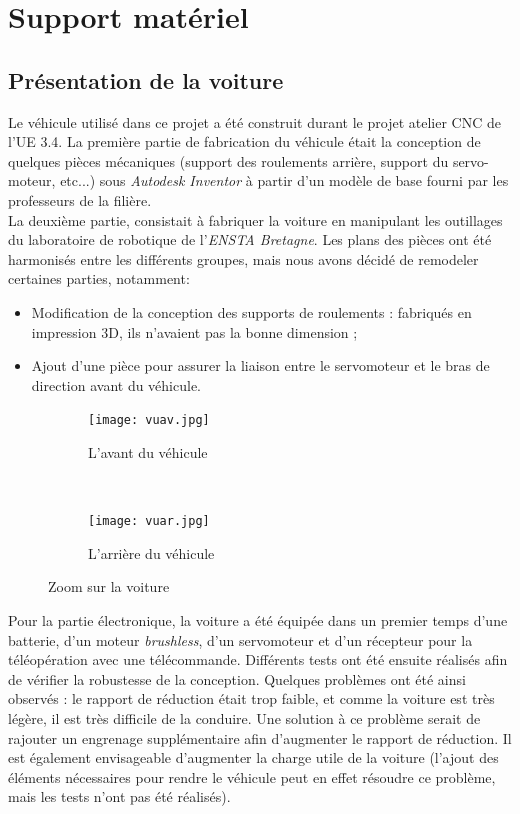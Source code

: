 \documentclass[12pt, openany]{report}
\begin{document}
\section{Support matériel}
\subsection{Présentation de la voiture}
Le véhicule utilisé dans ce projet a été construit durant le projet atelier \textsc{CNC} de l’UE 3.4. La première partie de fabrication du véhicule était la conception de quelques pièces mécaniques (support des roulements arrière, support du servo-moteur, etc...) sous \textit{Autodesk Inventor} à partir d'un modèle de base fourni par les professeurs de la filière.\\

La deuxième partie, consistait à fabriquer la voiture en manipulant les outillages du laboratoire de robotique de l'\textit{ENSTA Bretagne}. Les plans des pièces ont été harmonisés entre les différents groupes, mais nous avons décidé de remodeler certaines parties, notamment:

\begin{itemize}[label=\textbullet, font=\small]
    \item Modification de la conception des supports de roulements : fabriqués en impression \textsc{3D}, ils n'avaient pas la bonne dimension ;
    \item Ajout d'une pièce pour assurer la liaison entre le servomoteur et le bras de direction avant du véhicule.\\
\end{itemize}

\begin{figure}[H]
     \centering
     \begin{subfigure}[b]{0.45\textwidth}
         \centering
         \texttt{[image: vuav.jpg]}
         \caption{L'avant du véhicule}
     \end{subfigure}
     ~
     \begin{subfigure}[b]{0.45\textwidth}
         \centering
         \texttt{[image: vuar.jpg]}
         \caption{L'arrière du véhicule}
     \end{subfigure}
     \caption{Zoom sur la voiture}
\end{figure}

Pour la partie électronique, la voiture a été équipée dans un premier temps d'une batterie, d'un moteur \textit{brushless}, d'un servomoteur et d'un récepteur pour la téléopération avec une télécommande. Différents tests ont été ensuite réalisés afin de vérifier la robustesse de la conception. Quelques problèmes ont été ainsi observés : le rapport de réduction était trop faible, et comme la voiture est très légère, il est très difficile de la conduire. Une solution à ce problème serait de rajouter un engrenage supplémentaire afin d'augmenter le rapport de réduction. Il est également envisageable d'augmenter la charge utile de la voiture (l'ajout des éléments nécessaires pour rendre le véhicule peut en effet résoudre ce problème, mais les tests n'ont pas été réalisés).\\
\end{document}
